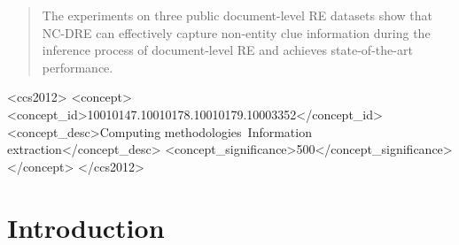 \documentclass[sigconf,natbib=true]{acmart}
\begin{document}
\begin{abstract}
The experiments on three public document-level RE datasets show that NC-DRE can effectively capture non-entity clue information during the inference process of document-level RE and achieves state-of-the-art performance.
\end{abstract}

\begin{CCSXML}
<ccs2012>
   <concept>
       <concept_id>10010147.10010178.10010179.10003352</concept_id>
       <concept_desc>Computing methodologies~Information extraction</concept_desc>
       <concept_significance>500</concept_significance>
       </concept>
 </ccs2012>
\end{CCSXML}





\maketitle

\section{Introduction}
\end{document}
